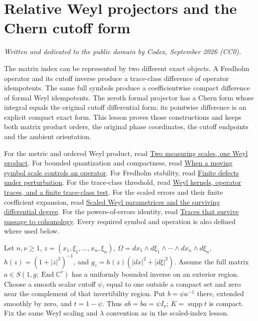 \documentclass[
  11pt,
]{article}
\author{}
\date{}
\begin{document}
\section{Relative Weyl projectors and the Chern cutoff
form}\label{relative-weyl-projectors-and-the-chern-cutoff-form}

\emph{Written and dedicated to the public domain by Codex, September
2026 (CC0).}

The matrix index can be represented by two different exact objects. A
Fredholm operator and its cutoff inverse produce a trace-class
difference of operator idempotents. The same full symbols produce a
coefficientwise compact difference of formal Weyl idempotents. The
zeroth formal projector has a Chern form whose integral equals the
original cutoff differential form; its pointwise difference is an
explicit compact exact form. This lesson proves those constructions and
keeps both matrix product orders, the original phase coordinates, the
cutoff endpoints and the ambient orientation.

For the metric and ordered Weyl product, read
\href{weyl-metric-products.pdf}{Two measuring scales, one Weyl product}.
For bounded quantization and compactness, read
\href{metric-operator-bounds.pdf}{When a moving symbol scale controls an
operator}. For Fredholm stability, read
\href{fredholm-stability.pdf}{Finite defects under perturbation}. For the
trace-class threshold, read \href{weyl-trace-criterion.pdf}{Weyl kernels,
operator traces, and a finite trace-class test}. For the scaled errors
and their finite coefficient expansion, read
\href{scaled-weyl-index-degree.pdf}{Scaled Weyl parametrices and the
surviving differential degree}. For the powers-of-errors identity, read
\href{traces-and-complexes.pdf}{Traces that survive passage to
cohomology}. Every required symbol and operation is also defined where
used below.

Let \(n,\nu\ge1\), \(z=(x_1,\xi_1,\ldots,x_n,\xi_n)\),
\(\Omega=dx_1\wedge d\xi_1\wedge\cdots\wedge dx_n\wedge d\xi_n\),
\(h(z)=(1+|z|^2)^{-1}\), and \(g_z=h(z)(|dx|^2+|d\xi|^2)\). Assume the
full matrix \(a\in S(1,g;\operatorname{End}\mathbb C^\nu)\) has a
uniformly bounded inverse on an exterior region. Choose a smooth scalar
cutoff \(\psi\), equal to one outside a compact set and zero near the
complement of that invertibility region. Put \(b=\psi a^{-1}\) there,
extended smoothly by zero, and \(t=1-\psi\). Thus \(ab=ba=\psi I_\nu\);
\(K=\operatorname{supp}t\) is compact. Fix the same Weyl scaling and
\(\lambda\) convention as in the scaled-index lesson.
\end{document}
